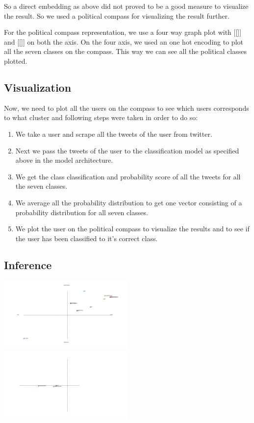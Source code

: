 \documentclass[10pt, oneside]{article}
\begin{document}
\begin{multicols}{2}
So a direct embedding as above did not proved to be a good measure to visualize the result. So we used a political compass for visualizing the result further. 

For the political compass representation, we use a four way graph plot with [[]] and [[]] on both the axis. On the four axis, we used an one hot encoding to plot all the seven classes on the compass. This way we can see all the political classes plotted. 

\subsection{Visualization}

Now, we need to plot all the users on the compass to see which users corresponds to what cluster and following steps were taken in order to do so:
\begin{enumerate}
	\item We take a user and scrape all the tweets of the user from twitter.
	\item Next we pass the tweets of the user to the classification model as specified above in the model architecture.
	\item We get the class classification and probability score  of all the tweets for all the seven classes.
	\item We average all the probability distribution to get one vector consisting of a probability distribution for all seven classes.
	\item We plot the user on the political compass to visualize the results and to see if the user has been classified to it’s correct class.
\end{enumerate}

\subsection{Inference}

\includegraphics[width=0.5\textwidth]{images/Political_Compass.png}
\includegraphics[width=0.5\textwidth]{images/Political_Compass-1.png}


\end{multicols}
\end{document}
